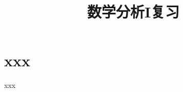 \everymath{\displaystyle}



\title[数分I\\
复习]{\texorpdfstring{\Huge \bfseries 数学分析I复习}{数学分析I复习}} %
\date{}





\begin{frame}

\titlepage %

\end{frame}




\section{xxx}


\begin{frame}{xxx}



\end{frame}




